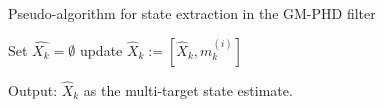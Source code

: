 \begin{algorithm}
    \caption{Pseudo-algorithm for state extraction in the GM-PHD filter}
    \begin{algorithmic}[1]

        \State Set $\hat{X_k} = \emptyset$
                    \State update $\hat{X}_k := [\hat{X}_k, m_k^{(i)}]$
                \EndFor
            \EndIf
        \EndFor

        \State Output: $\hat{X}_k$ as the multi-target state estimate.
    \end{algorithmic}
    \label{alg:phd_state_extraction}
\end{algorithm}





